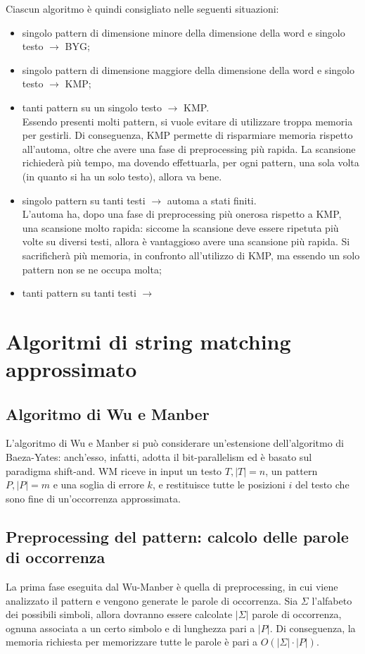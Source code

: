 Ciascun algoritmo è quindi consigliato nelle seguenti situazioni:
\begin{itemize}
    \item singolo pattern di dimensione minore della dimensione della word e singolo testo $\longrightarrow$ BYG;
    \item singolo pattern di dimensione maggiore della dimensione della word e singolo testo $\longrightarrow$ KMP;
    \item tanti pattern su un singolo testo $\longrightarrow$ KMP.\\
    Essendo presenti molti pattern, si vuole evitare di utilizzare troppa memoria per gestirli. Di conseguenza, KMP permette di risparmiare memoria rispetto all'automa, oltre che avere una fase di preprocessing più rapida. La scansione richiederà più tempo, ma dovendo effettuarla, per ogni pattern, una sola volta (in quanto si ha un solo testo), allora va bene.
    \item singolo pattern su tanti testi $\longrightarrow$ automa a stati finiti.\\
    L'automa ha, dopo una fase di preprocessing più onerosa rispetto a KMP, una scansione molto rapida: siccome la scansione deve essere ripetuta più volte su diversi testi, allora è vantaggioso avere una scansione più rapida. Si sacrificherà più memoria, in confronto all'utilizzo di KMP, ma essendo un solo pattern non se ne occupa molta;
    \item tanti pattern su tanti testi $\longrightarrow$
\end{itemize}

\section{Algoritmi di string matching approssimato}
\subsection*{Algoritmo di Wu e Manber}
L'algoritmo di Wu e Manber si può considerare un'estensione dell'algoritmo di Baeza-Yates: anch'esso, infatti, adotta il bit-parallelism ed è basato sul paradigma shift-and.
WM riceve in input un testo $T, |T| = n$, un pattern $P, |P|=m$ e una soglia di errore $k$, e restituisce tutte le posizioni $i$ del testo che sono fine di un'occorrenza approssimata.

\subsection{Preprocessing del pattern: calcolo delle parole di occorrenza}
La prima fase eseguita dal Wu-Manber è quella di preprocessing, in cui viene analizzato il pattern e vengono generate le parole di occorrenza. Sia $\Sigma$ l'alfabeto dei possibili simboli, allora dovranno essere calcolate $|\Sigma|$ parole di occorrenza, ognuna associata a un certo simbolo e di lunghezza pari a $|P|$.
Di conseguenza, la memoria richiesta per memorizzare tutte le parole è pari a $O(|\Sigma| \cdot |P|)$.

